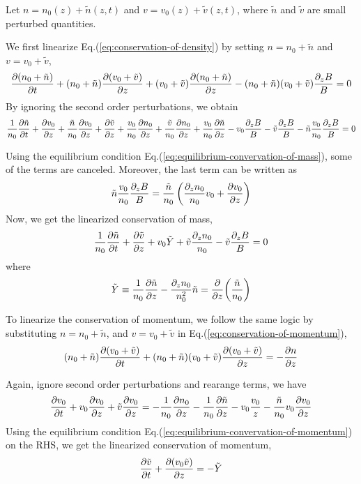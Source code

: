 Let $n = n_0(z) + \tilde{n}(z,t)$ and $v = v_0(z) + \tilde{v}(z,t)$, where $\tilde{n}$ and $\tilde{v}$ are small perturbed quantities.

We first linearize Eq.(\ref{eq:conservation-of-density}) by setting $n=n_0+\tilde{n}$ and $v=v_0+\tilde{v}$,
\[    \pdv{(n_0+\tilde{n})}{t}
    + (n_0+\tilde{n})\pdv{(v_0+\tilde{v})}{z}
    + (v_0+\tilde{v})\pdv{(n_0+\tilde{n})}{z}
    - (n_0+\tilde{n})(v_0+\tilde{v})\frac{\partial_z B}{B} = 0
\]
By ignoring the second order perturbations, we obtain
\[ \frac{1}{n_0}\pdv{\tilde{n}}{t}
    + \pdv{v_0}{z} + \frac{\tilde{n}}{n_0}\pdv{v_0}{z} + \pdv{\tilde{v}}{z}
    + \frac{v_0}{n_0}\pdv{n_0}{z} + \frac{\tilde{v}}{n_0}\pdv{n_0}{z} + \frac{v_0}{n_0}\pdv{\tilde{n}}{z}
    - v_0\frac{\partial_z B}{B} - \tilde{v}\frac{\partial_z B}{B} - \tilde{n}\frac{v_0}{n_0}\frac{\partial_z B}{B} = 0
\]


Using the equilibrium condition Eq.(\ref{eq:equilibrium-convervation-of-mass}), some of the terms are canceled. Moreover, the last term can be written as
\[ \tilde{n}\frac{v_0}{n_0}\frac{\partial_z B}{B} = \frac{\tilde{n}}{n_0}\left( \frac{\partial_z n_0}{n_0}v_0 + \pdv{v_0}{z} \right) \]
Now, we get the linearized conservation of mass,
\begin{equation} \label{eq:linearized-conservation-of-density}
    \frac{1}{n_0}\pdv{\tilde{n}}{t}
    + \pdv{\tilde{v}}{z} + v_0\tilde{Y} + \tilde{v}\frac{\partial_z n_0}{n_0} - \tilde{v}\frac{\partial_z B}{B} = 0
\end{equation}
where
\[ \tilde{Y} \equiv \frac{1}{n_0}\pdv{\tilde{n}}{z} - \frac{\partial_z n_0}{n_0^2}\tilde{n} = \pdv{z}(\frac{\tilde{n}}{n_0}) \]

To linearize the conservation of momentum, we follow the same logic by substituting $n=n_0+\tilde{n}$, and $v=v_0+\tilde{v}$ in Eq.(\ref{eq:conservation-of-momentum}),
\[ (n_0+\tilde{n})\pdv{(v_0+\tilde{v})}{t} + (n_0+\tilde{n})(v_0+\tilde{v})\pdv{(v_0+\tilde{v})}{z} = -\pdv{n}{z} \]

Again, ignore second order perturbations and rearange terms, we have
\[ \pdv{v_0}{t} + v_0\pdv{v_0}{z} + \tilde{v}\pdv{v_0}{z}
    = -\frac{1}{n_0}\pdv{n_0}{z} -\frac{1}{n_0}\pdv{\tilde{n}}{z} -v_0\frac{v_0}{z} - \frac{\tilde{n}}{n_0}v_0\pdv{v_0}{z} \]
Using the equilibrium condition Eq.(\ref{eq:equilibrium-convervation-of-momentum}) on the RHS, we get the linearized conservation of momentum,
\begin{equation} \label{eq:linearized-conservation-of-momentum}
    \pdv{\tilde{v}}{t} + \pdv{(v_0\tilde{v})}{z} = -\tilde{Y}
\end{equation}

